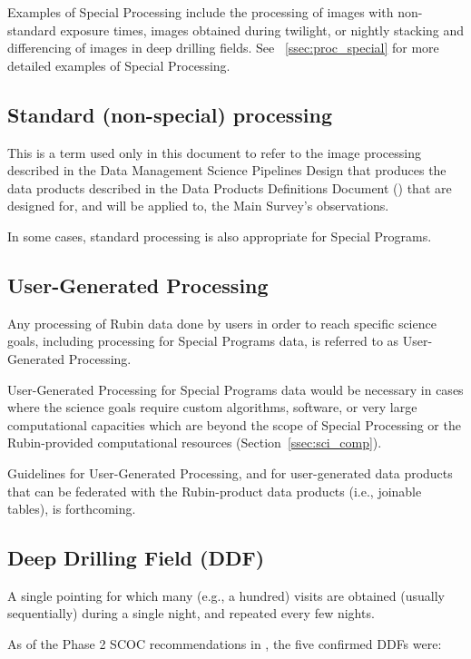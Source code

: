 Examples of Special Processing include the processing
of images with non-standard exposure times, images obtained
during twilight, or nightly stacking and differencing
of images in deep drilling fields.
See \Section~\ref{ssec:proc_special} for more detailed examples of Special Processing.

\subsection{Standard (non-special) processing}

This is a term used only in this document to refer to the image processing 
described in the Data Management Science Pipelines Design  that produces the data products described in the Data Products Definitions Document
() that are designed for, and will be applied to, the Main Survey's observations.

In some cases, standard processing is also appropriate for Special Programs.


\subsection{User-Generated Processing}

Any processing of Rubin data done by users in order to reach specific science goals, including
processing for Special Programs data, is referred to as User-Generated Processing.

User-Generated Processing for Special Programs data would be necessary in cases where
the science goals require custom algorithms, software, or very large computational
capacities which are beyond the scope of Special Processing or the Rubin-provided
computational resources (Section~\ref{ssec:sci_comp}).

Guidelines for User-Generated Processing, and for user-generated data products
that can be federated with the Rubin-product data products (i.e., joinable tables),
is forthcoming.

\subsection{Deep Drilling Field (DDF)}

A single pointing for which many (e.g., a hundred) visits are obtained 
(usually sequentially) during a single night, and repeated every few 
nights.

As of the Phase 2 SCOC recommendations in , the five 
confirmed DDFs were:

